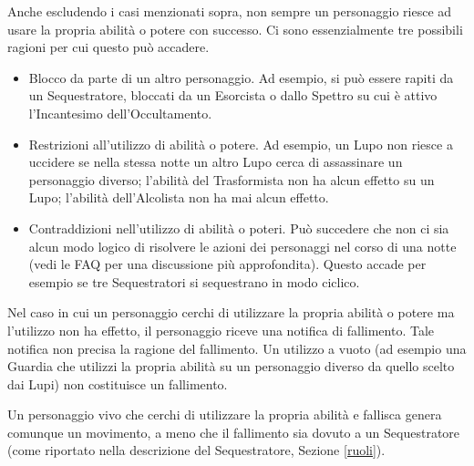 \documentclass[a4paper,10pt]{article}
\begin{document}
Anche escludendo i casi menzionati sopra, non sempre un personaggio riesce ad usare la propria abilità o potere con successo. Ci sono essenzialmente tre possibili ragioni per cui questo può accadere.

\begin{itemize}
	\item Blocco da parte di un altro personaggio. Ad esempio, si può essere rapiti da un Sequestratore, bloccati da un Esorcista o dallo Spettro su cui è attivo l'Incantesimo dell'Occultamento.
	\item Restrizioni all'utilizzo di abilità o potere. Ad esempio, un Lupo non riesce a uccidere se nella stessa notte un altro Lupo cerca di assassinare un personaggio diverso; l'abilità del Trasformista non ha alcun effetto su un Lupo; l'abilità dell'Alcolista non ha mai alcun effetto.
	\item Contraddizioni nell'utilizzo di abilità o poteri. Può succedere che non ci sia alcun modo logico di risolvere le azioni dei personaggi nel corso di una notte (vedi le FAQ per una discussione più approfondita). Questo accade per esempio se tre Sequestratori si sequestrano in modo ciclico.
\end{itemize}

Nel caso in cui un personaggio cerchi di utilizzare la propria abilità o potere ma l'utilizzo non ha effetto, il personaggio riceve una notifica di fallimento. Tale notifica non precisa la ragione del fallimento. Un utilizzo a vuoto (ad esempio una Guardia che utilizzi la propria abilità su un personaggio diverso da quello scelto dai Lupi) non costituisce un fallimento.

Un personaggio vivo che cerchi di utilizzare la propria abilità e fallisca genera comunque un movimento, a meno che il fallimento sia dovuto a un Sequestratore (come riportato nella descrizione del Sequestratore, Sezione \ref{ruoli}).
\end{document}
